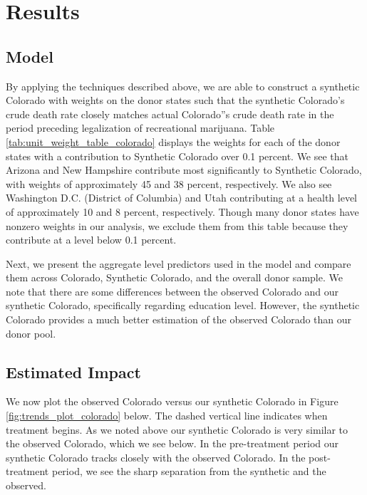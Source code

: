 \documentclass{article}
\begin{document}
\section{Results}

\subsection{Model}

By applying the techniques described above, we are able to construct a synthetic Colorado with weights on the donor states such that the synthetic Colorado's crude death rate closely matches actual Colorado''s crude death rate in the period preceding legalization of recreational marijuana. Table \ref{tab:unit_weight_table_colorado} displays the weights for each of the donor states with a contribution to Synthetic Colorado over 0.1 percent. We see that Arizona and New Hampshire contribute most significantly to Synthetic Colorado, with weights of approximately 45 and 38 percent, respectively. We also see Washington D.C. (District of Columbia) and Utah contributing at a health level of approximately 10 and 8 percent, respectively. Though many donor states have nonzero weights in our analysis, we exclude them from this table because they contribute at a level below 0.1 percent.



Next, we present the aggregate level predictors used in the model and compare them across Colorado, Synthetic Colorado, and the overall donor sample. We note that there are some differences between the observed Colorado and our synthetic Colorado, specifically regarding education level. However, the synthetic Colorado provides a much better estimation of the observed Colorado than our donor pool. 



\subsection{Estimated Impact}

We now plot the observed Colorado versus our synthetic Colorado in Figure \ref{fig:trends_plot_colorado} below. The dashed vertical line indicates when treatment begins. As we noted above our synthetic Colorado is very similar to the observed Colorado, which we see below. In the pre-treatment period our synthetic Colorado tracks closely with the observed Colorado. In the post-treatment period, we see the sharp separation from the synthetic and the observed. 
\end{document}
